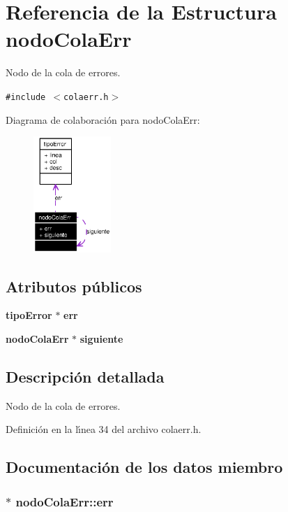 \section{Referencia de la Estructura nodo\-Cola\-Err}
\label{structnodoColaErr}
Nodo de la cola de errores.  


{\tt \#include $<$colaerr.h$>$}

Diagrama de colaboraci\'{o}n para nodo\-Cola\-Err:\begin{figure}[H]
\begin{center}
\leavevmode
\includegraphics[width=83pt]{structnodoColaErr__coll__graph}
\end{center}
\end{figure}
\subsection*{Atributos p\'{u}blicos}
\begin{CompactItemize}
\item 
{\bf tipo\-Error} $\ast$ {\bf err}
\item 
{\bf nodo\-Cola\-Err} $\ast$ {\bf siguiente}
\end{CompactItemize}


\subsection{Descripci\'{o}n detallada}
Nodo de la cola de errores. 



Definici\'{o}n en la l\'{\i}nea 34 del archivo colaerr.h.

\subsection{Documentaci\'{o}n de los datos miembro}
\subsubsection{$\ast$ {\bf nodo\-Cola\-Err::err}}\label{structnodoColaErr_o0}




